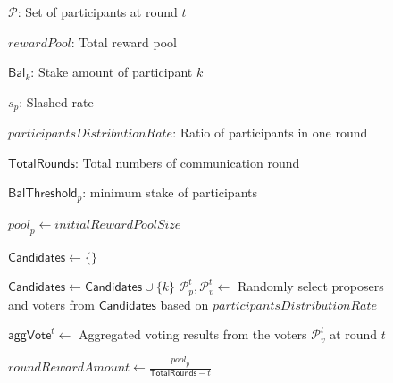 \documentclass[conference]{IEEEtran}
\newcommand{\rui}[1]{{\color{black} #1}}
\begin{document}
\begin{figure}[htbp]
\begin{mdframed}[backgroundcolor=gray!10, roundcorner=10pt]
\begin{algorithm}[H]
    \centering
    \begin{algorithmic}[1]
    \Statex 
    \Statex 
        \Statex $\mathcal{P}$: Set of participants at round $t$

        \Statex ${rewardPool}$: Total reward pool
        
        \Statex $\mathsf{Bal}_k$: Stake amount of participant $k$
    
        \Statex $s_p$: Slashed rate

        \Statex $participantsDistributionRate$: Ratio of participants in one round
        
        \Statex $\mathsf{TotalRounds}$: \rui{Total numbers of communication round}

        
        \Statex $\mathsf{BalThreshold}_p$: minimum stake of participants


        \State ${pool}_p \leftarrow initialRewardPoolSize$
        \For{\rui{$t = 0; t < \mathsf{TotalRounds}$}}
        
        \State $\mathsf{Candidates} \leftarrow \{\}$
        
        \State $\mathsf{Candidates} \leftarrow \mathsf{Candidates} \cup \{k\}$
        \EndIf
        \EndFor
        \State $\mathcal{P}_p^t, \mathcal{P}_v^t\leftarrow$ Randomly select proposers and voters from $\mathsf{Candidates}$ based on $participantsDistributionRate$


        \State $\mathsf{aggVote}^t \leftarrow$ Aggregated voting results from the voters $ \mathcal{P}_v^t$ at round $t$

 

        \State
        $roundRewardAmount \leftarrow \frac{{pool}_p}{\mathsf{TotalRounds} -t }$


     

\end{algorithmic}
\end{algorithm}
\end{mdframed}
\end{figure}
\end{document}
